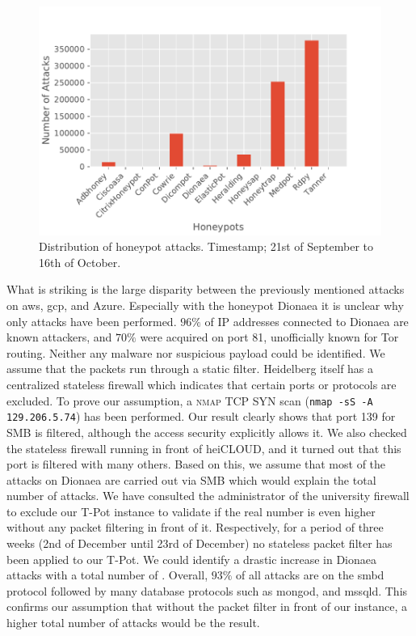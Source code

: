 \begin{figure}[ht]
    \centering
    \includegraphics[width=\textwidth]{figures/tpot-overview-attacks.pdf}
    \caption[Distribution of honeypot attacks]{
        Distribution of honeypot attacks.
        Timestamp; 21st of September to 16th of October.
    }
    \label{fig:overview-attacks}
\end{figure}

What is striking is the large disparity between the previously mentioned attacks on \ac{aws}, \ac{gcp}, and Azure.
Especially with the honeypot Dionaea it is unclear why only  attacks have been performed.
$96\%$ of IP addresses connected to Dionaea are known attackers, and $70\%$ were acquired on port 81, unofficially known for Tor routing.
Neither any malware nor suspicious payload could be identified.
We assume that the packets run through a static filter.
Heidelberg itself has a centralized stateless firewall which indicates that certain ports or protocols are excluded.
To prove our assumption, a \textsc{nmap} TCP SYN scan (\verb|nmap -sS -A 129.206.5.74|) has been performed.
Our result clearly shows that port 139 for SMB is filtered, although the access security explicitly allows it.
We also checked the stateless firewall running in front of heiCLOUD, and it turned out that this port is filtered with many others.
Based on this, we assume that most of the attacks on Dionaea are carried out via SMB which would explain the total number of attacks.
We have consulted the administrator of the university firewall to exclude our T-Pot instance to validate if the real number is even higher without any packet filtering in front of it.
Respectively, for a period of three weeks (2nd of December until 23rd of December) no stateless packet filter has been applied to our T-Pot.
We could identify a drastic increase in Dionaea attacks with a total number of .
Overall, $93\%$ of all attacks are on the smbd protocol followed by many database protocols such as mongod, and mssqld.
This confirms our assumption that without the packet filter in front of our instance, a higher total number of attacks would be the result.

